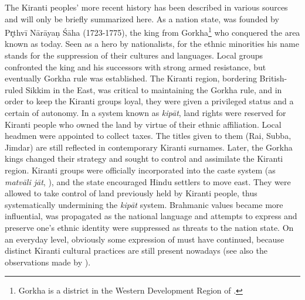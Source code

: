The Kiranti peoples' more recent history has been described in various sources  \citep{Caplan1970_Land, Pradhan1991The-Gorkha, Gaenszle2002_Remaking, Schlemmer2003_New, Whelpton2005A-History} and will  only be briefly summarized here. As a nation state,  was founded by Pr̥thvī Nārāyaṇ Śāha (1723-1775), the king from Gorkha\footnote{Gorkha is a district in the Western Development Region of .} who conquered the area known as  today. Seen as a hero by  nationalists, for the ethnic minorities his name stands for the suppression of their cultures and languages. Local groups confronted the king and his successors with strong armed resistance, but eventually Gorkha rule was established. The Kiranti region, bordering British-ruled Sikkim in the East, was critical to maintaining the Gorkha rule, and in order to keep the Kiranti groups loyal, they were given a privileged status and a certain  of autonomy. In a system known as \emph{kipāt}, land rights were reserved for Kiranti people who owned the land by virtue of their ethnic affiliation. Local headmen were appointed to collect taxes. The titles given to them (Rai, Subba, Jimdar) are still reflected in contemporary Kiranti surnames. Later, the Gorkha kings changed their strategy and sought to control and assimilate the Kiranti region. Kiranti groups were officially incorporated into the caste system (as \emph{matvāli jāt}, ), and the state encouraged Hindu settlers to move east. They were allowed to take control of land previously held by Kiranti people, thus systematically undermining the \emph{kipāt} system. Brahmanic values became more influential,  was propagated as the national language and attempts to express and preserve one's ethnic identity were suppressed as threats to the nation state. On an everyday level,  obviously some expression of  must have continued, because distinct Kiranti cultural practices are still present nowadays (see also the observations made by \citealt{Russell2004Traditions}).
 

